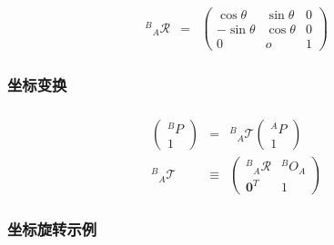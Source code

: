 \documentclass{beamer}
\newcommand{\tmmathbf}[1]{\ensuremath{\boldsymbol{#1}}}
\begin{document}
{{\begin{frame}
\end{frame}}{\begin{frame}
  \frametitle{}
  
  \
  
  \
  
  
  \begin{eqnarray*}
    {}^B {}_A \mathcal{R} & = & \left(\begin{array}{ccc}
      \cos \theta & \sin \theta & 0\\
      - \sin \theta & \cos \theta & 0\\
      0 & o & 1
    \end{array}\right)
  \end{eqnarray*}
\end{frame}}{\frametitle{坐标变换}

}{\begin{frame}
  \frametitle{}
  \begin{eqnarray*}
    \left(\begin{array}{c}
      {}^B P\\
      1
    \end{array}\right) & = & {}^B {}_A \mathcal{T} \left(\begin{array}{c}
      {}^A P\\
      1
    \end{array}\right)\\
    {}^B {}_A \mathcal{T} & \equiv & \left(\begin{array}{cc}
      {}^B {}_A \mathcal{R} & {}^B O_A\\
      \tmmathbf{0}^T & 1
    \end{array}\right)
  \end{eqnarray*}
\end{frame}}{\begin{frame}
  \frametitle{坐标旋转示例}
  

\end{frame}}}
\end{document}
